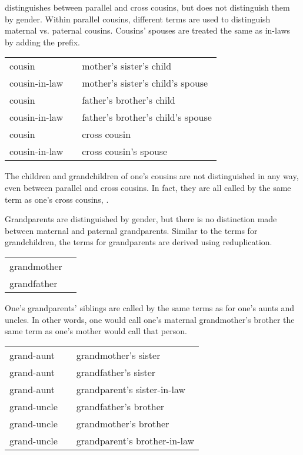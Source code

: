 \langtvk{} distinguishes between parallel and cross cousins, but does not distinguish them by gender. Within parallel cousins, different terms are used to distinguish maternal vs. paternal cousins. Cousins' spouses are treated the same as in-laws by adding the  prefix.

\exdisplay\noexno
	\begin{tabu} {l l l}
		cousin &  & mother's sister's child\\
		cousin-in-law &  & mother's sister's child's spouse\\
		cousin &  & father's brother's child\\
		cousin-in-law &  & father's brother's child's spouse\\
		cousin &  & cross cousin\\
		cousin-in-law &  & cross cousin's spouse\\
	\end{tabu}
\xe

The children and grandchildren of one's cousins are not distinguished in any way, even between parallel and cross cousins. In fact, they are all called by the same term as one's cross cousins, .

Grandparents are distinguished by gender, but there is no distinction made between maternal and paternal grandparents. Similar to the terms for grandchildren, the terms for grandparents are derived using reduplication.

\exdisplay\noexno
	\begin{tabu} {l l}
		grandmother & \\
		grandfather & \\
	\end{tabu}
\xe

One's grandparents' siblings are called by the same terms as for one's aunts and uncles. In other words, one would call one's maternal grandmother's brother the same term as one's mother would call that person.

\exdisplay\noexno
	\begin{tabu} {l l l}
		grand-aunt &  & grandmother's sister\\
		grand-aunt &  & grandfather's sister\\
		grand-aunt &  & grandparent's sister-in-law\\
		grand-uncle &  & grandfather's brother\\
		grand-uncle &  & grandmother's brother\\
		grand-uncle &  & grandparent's brother-in-law\\
	\end{tabu}
\xe


